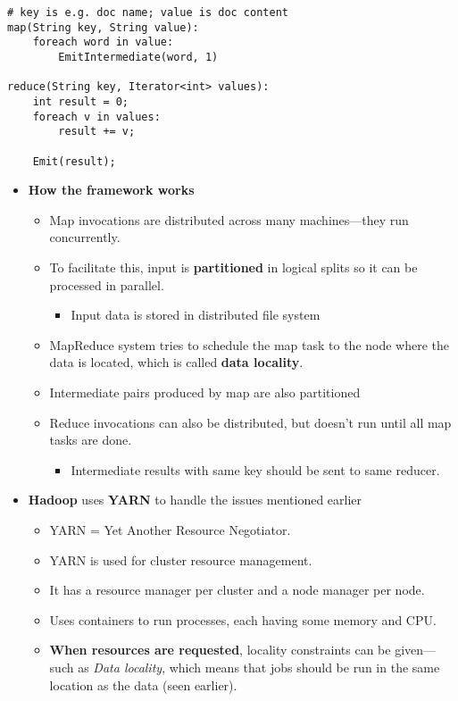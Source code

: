 \begin{multicols}{2}
\begin{verbatim}
# key is e.g. doc name; value is doc content
map(String key, String value):
    foreach word in value:
        EmitIntermediate(word, 1)

reduce(String key, Iterator<int> values):
    int result = 0;
    foreach v in values:
        result += v;
 
    Emit(result);
\end{verbatim}

\begin{itemize}
\item
  \textbf{How the framework works}

  \begin{itemize}
    \item
    Map invocations are distributed across many machines---they run
    concurrently.
  \item
    To facilitate this, input is \textbf{partitioned} in logical splits
    so it can be processed in parallel.

    \begin{itemize}
        \item
      Input data is stored in distributed file system
    \end{itemize}
  \item
    MapReduce system tries to schedule the map task to the node where
    the data is located, which is called \textbf{data locality}.
  \item
    Intermediate pairs produced by map are also partitioned
  \item
    Reduce invocations can also be distributed, but doesn't run until
    all map tasks are done.

    \begin{itemize}
        \item
      Intermediate results with same key should be sent to same reducer.
    \end{itemize}
  \end{itemize}
\item
  \textbf{Hadoop} uses \textbf{YARN} to handle the issues mentioned
  earlier

  \begin{itemize}
    \item
    YARN = Yet Another Resource Negotiator.
  \item
    YARN is used for cluster resource management.
  \item
    It has a resource manager per cluster and a node manager per node.
  \item
    Uses containers to run processes, each having some memory and CPU.
  \item
    \textbf{When resources are requested}, locality constraints can be
    given---such as \emph{Data locality}, which means that jobs should
    be run in the same location as the data (seen earlier).


\end{itemize}
\end{itemize}
\end{multicols}
